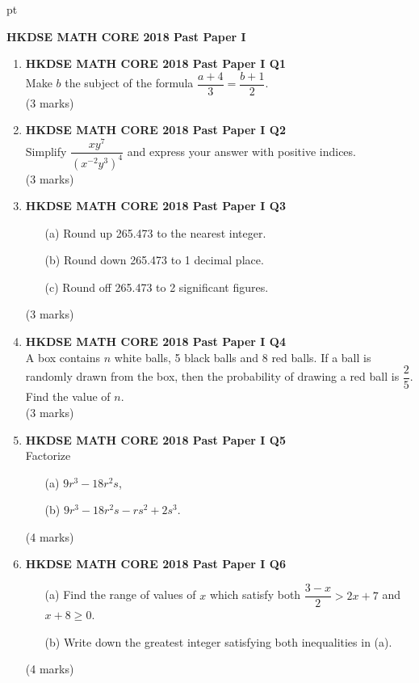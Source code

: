\documentclass[12pt]{article}
\begin{document}
 pt
\begin{center}
	{\large \bf HKDSE MATH CORE 2018 Past Paper I}\\
	\vspace{2 mm}

\end{center}
\vspace{0.05cm}

\begin{enumerate}
	\item \textbf{HKDSE MATH CORE 2018 Past Paper I Q1}\\
	Make $b$ the subject of the formula $\dfrac{a+4}{3} = \dfrac{b+1}{2}$. \\(3 marks)

	\item \textbf{HKDSE MATH CORE 2018 Past Paper I Q2}\\
	Simplify $\dfrac{xy^7}{(x^{-2}y^3)^4}$ and express your answer with positive indices. \\(3 marks)

	\item \textbf{HKDSE MATH CORE 2018 Past Paper I Q3}
	\begin{enumerate}
		\item[(a)] Round up 265.473 to the nearest integer.
		\item[(b)] Round down 265.473 to 1 decimal place.
		\item[(c)] Round off 265.473 to 2 significant figures.
	\end{enumerate}
	(3 marks)

	\item \textbf{HKDSE MATH CORE 2018 Past Paper I Q4}\\
	A box contains $n$ white balls, 5 black balls and 8 red balls. If a ball is randomly drawn from the box, then the probability of drawing a red ball is $\dfrac{2}{5}$. Find the value of $n$. \\(3 marks)

	\item \textbf{HKDSE MATH CORE 2018 Past Paper I Q5}\\
	Factorize
	\begin{enumerate}
		\item[(a)] $9r^3 - 18r^2s$,
		\item[(b)] $9r^3 - 18r^2s - rs^2 + 2s^3$.
	\end{enumerate}
	(4 marks)

	\item \textbf{HKDSE MATH CORE 2018 Past Paper I Q6}
	\begin{enumerate}
		\item[(a)] Find the range of values of $x$ which satisfy both $\dfrac{3 - x}{2} > 2x + 7$ and $x + 8 \geq 0$.	   
		\item[(b)] Write down the greatest integer satisfying both inequalities in (a).	
	\end{enumerate}
	(4 marks)


\end{enumerate}
\end{document}
